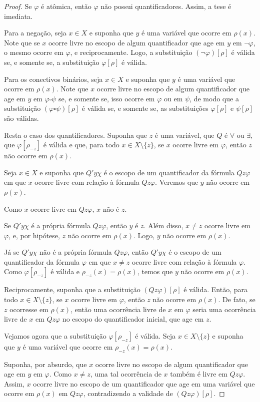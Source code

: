 \begin{proof}
    Se $\varphi$ é atômica, então $\varphi$ não possui quantificadores.
    Assim, a tese é imediata.

    Para a negação, seja $x \in X$ e suponha que $y$ é uma variável que ocorre em $\rho(x)$.
    Note que se $x$ ocorre livre no escopo de algum quantificador que age em $y$ em $\neg \varphi$, o mesmo ocorre em $\varphi$, e reciprocamente.
    Logo, a substituição $(\neg \varphi)[\rho]$ é válida se, e somente se, a substituição $\varphi[\rho]$ é válida.
    

    Para os conectivos binários, seja $x \in X$ e suponha que $y$ é uma variável que ocorre em $\rho(x)$.
    Note que $x$ ocorre livre no escopo de algum quantificador que age em $y$ em $\varphi \square \psi$ se, e somente se, isso ocorre em $\varphi$ ou em $\psi$, de modo que a substituição $(\varphi \square \psi)[\rho]$ é válida se, e somente se, as substituições $\varphi[\rho]$ e $\psi[\rho]$ são válidas.

    Resta o caso dos quantificadores.
    Suponha que $z$ é uma variável, que $Q$ é $\forall$ ou $\exists$, que $\varphi[\rho_{-z}]$ é válida e que, para todo $x\in X\setminus\{z\}$, se $x$ ocorre livre em $\varphi$, então $z$ não ocorre em $\rho(x)$.

    Seja $x \in X$ e suponha que $Q'y\chi$ é o escopo de um quantificador da fórmula $Qz\varphi$ em que $x$ ocorre livre com relação à fórmula $Qz\varphi$.
    Veremos que $y$ não ocorre em $\rho(x)$.

    Como $x$ ocorre livre em $Qz\varphi$, $x$ não é $z$.

    Se $Q'y\chi$ é a própria fórmula $Qz\varphi$, então $y$ é $z$.
    Além disso, $x\neq z$ ocorre livre em $\varphi$, e, por hipótese, $z$ não ocorre em $\rho(x)$.
    Logo, $y$ não ocorre em $\rho(x)$.

    Já se $Q'y\chi$ não é a própria fórmula $Qz\varphi$, então $Q'y\chi$ é o escopo de um quantificador da fórmula $\varphi$ em que $x\neq z$ ocorre livre com relação à fórmula $\varphi$.
    Como $\varphi[\rho_{-z}]$ é válida e $\rho_{-z}(x)=\rho(x)$, temos que $y$ não ocorre em $\rho(x)$.

    Reciprocamente, suponha que a substituição $(Qz\varphi)[\rho]$ é válida.
    Então, para todo $x\in X\setminus\{z\}$, se $x$ ocorre livre em $\varphi$, então $z$ não ocorre em $\rho(x)$.
    De fato, se $z$ ocorresse em $\rho(x)$, então uma ocorrência livre de $x$ em $\varphi$ seria uma ocorrência livre de $x$ em $Qz\varphi$ no escopo do quantificador inicial, que age em $z$.

    Vejamos agora que a substituição $\varphi[\rho_{-z}]$ é válida.
    Seja $x\in X\setminus\{z\}$ e suponha que $y$ é uma variável que ocorre em $\rho_{-z}(x)=\rho(x)$.

    Suponha, por absurdo, que $x$ ocorre livre no escopo de algum quantificador que age em $y$ em $\varphi$.
    Como $x\neq z$, uma tal ocorrência de $x$ também é livre em $Qz\varphi$.
    Assim, $x$ ocorre livre no escopo de um quantificador que age em uma variável que ocorre em $\rho(x)$ em $Qz\varphi$, contradizendo a validade de $(Qz\varphi)[\rho]$.
\end{proof}

